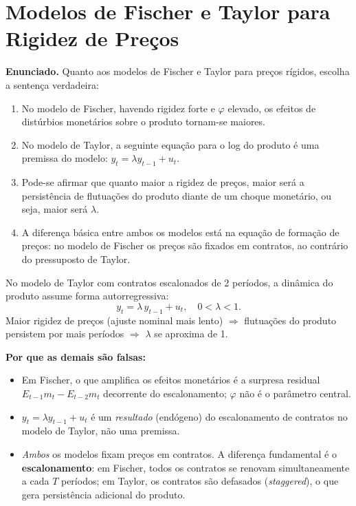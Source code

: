 \documentclass[12pt, a4paper]{article}
\begin{document}
\section{Modelos de Fischer e Taylor para Rigidez de Preços}

\textbf{Enunciado.} Quanto aos modelos de Fischer e Taylor para preços rígidos, escolha a sentença verdadeira:

\begin{enumerate}[label=\alph*)]
\item No modelo de Fischer, havendo rigidez forte e $\varphi$ elevado, os efeitos de distúrbios monetários sobre o produto tornam-se maiores.
\item No modelo de Taylor, a seguinte equação para o log do produto é uma premissa do modelo: $y_t = \lambda y_{t-1} + u_t$.
\item Pode-se afirmar que quanto maior a rigidez de preços, maior será a persistência de flutuações do produto diante de um choque monetário, ou seja, maior será $\lambda$.
\item A diferença básica entre ambos os modelos está na equação de formação de preços: no modelo de Fischer os preços são fixados em contratos, ao contrário do pressuposto de Taylor.
\end{enumerate}

\begin{correctbox}[title={Resposta correta: c)}]
No modelo de Taylor com contratos escalonados de 2 períodos, a dinâmica do produto assume
forma autorregressiva:
\[
y_t = \lambda\, y_{t-1} + u_t, \quad 0 < \lambda < 1.
\]
Maior rigidez de preços (ajuste nominal mais lento) $\Rightarrow$ flutuações do produto persistem
por mais períodos $\Rightarrow$ $\lambda$ se aproxima de 1. \checkmark

\textbf{Por que as demais são falsas:}
\begin{itemize}[leftmargin=*]
\item[a)] Em Fischer, o que amplifica os efeitos monetários é a surpresa residual
$E_{t-1}m_t - E_{t-2}m_t$ decorrente do escalonamento; $\varphi$ não é o parâmetro central.
\item[b)] $y_t = \lambda y_{t-1} + u_t$ é um \emph{resultado} (endógeno) do escalonamento
de contratos no modelo de Taylor, não uma premissa.
\item[d)] \emph{Ambos} os modelos fixam preços em contratos. A diferença fundamental é o
\textbf{escalonamento}: em Fischer, todos os contratos se renovam simultaneamente a cada
$T$ períodos; em Taylor, os contratos são defasados (\textit{staggered}), o que gera
persistência adicional do produto.
\end{itemize}
\end{correctbox}
\end{document}
